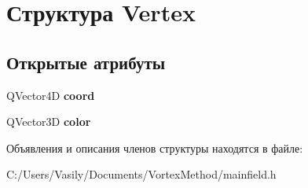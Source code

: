 \hypertarget{struct_vertex}{}\section{Структура Vertex}
\label{struct_vertex}
\subsection*{Открытые атрибуты}
\begin{DoxyCompactItemize}
\item 
\mbox{\label{struct_vertex_a41a58cd0260e9988f6ad5b62698d14f1}} 
Q\+Vector4D {\bfseries coord}
\item 
\mbox{\label{struct_vertex_a2581c1e0f4c0f895f4da2f387b6f1b41}} 
Q\+Vector3D {\bfseries color}
\end{DoxyCompactItemize}


Объявления и описания членов структуры находятся в файле\+:\begin{DoxyCompactItemize}
\item 
C\+:/\+Users/\+Vasily/\+Documents/\+Vortex\+Method/mainfield.\+h\end{DoxyCompactItemize}
